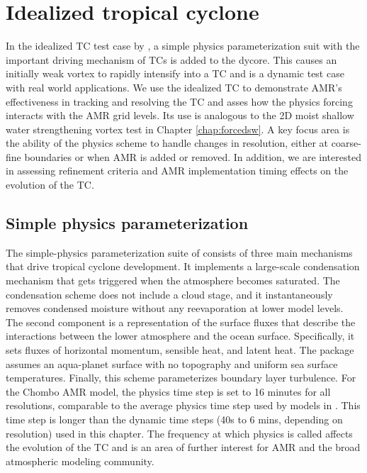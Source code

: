 \section{Idealized tropical cyclone}
\label{sec:tctest}

In the idealized TC test case by \cite{reed2012idealized}, a simple 
physics parameterization suit with the important driving mechanism of TCs
is added to the dycore. This causes
an initially weak vortex to rapidly intensify into a TC
and is a dynamic test case with real world applications.
We use the idealized TC to demonstrate AMR's effectiveness in tracking and resolving
the TC and asses how the physics forcing interacts with the AMR grid levels.
Its use is analogous to the 2D moist shallow water strengthening vortex test 
in Chapter \ref{chap:forcedsw}. A key focus area is the ability of the physics scheme
to handle changes in resolution, either at coarse-fine boundaries or when AMR is added
or removed. In addition, we are interested in assessing refinement criteria and AMR 
implementation timing effects on the evolution of the TC.

\subsection{Simple physics parameterization}
  The simple-physics parameterization suite of \cite{reed2012idealized}
  consists of three main mechanisms that drive tropical cyclone development.
  It implements a large-scale condensation mechanism that gets 
  triggered when the atmosphere becomes saturated. 
  The condensation scheme does not include a cloud stage, and it 
  instantaneously removes condensed moisture
  without any reevaporation at lower model levels. The 
  second component is a representation of the surface fluxes 
  that describe the interactions between the lower atmosphere and the ocean surface. 
  Specifically, it sets fluxes of horizontal momentum,
  sensible heat, and latent heat. The package assumes an aqua-planet surface with no topography
  and uniform sea surface temperatures. Finally, this scheme parameterizes boundary layer
  turbulence. For the Chombo AMR model, the physics time step is set to 16 minutes for all resolutions,
  comparable to the average physics time step
  used by models in \cite{reed2012idealized}. This time step is longer than 
  the dynamic time steps (40s to 6 mins, depending on resolution) used in this chapter.
  The frequency at which physics is called affects the evolution of the TC and
  is an area of further interest for AMR and the broad atmospheric modeling community.
  
